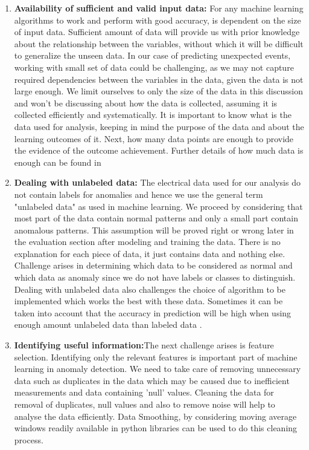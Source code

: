 \begin{enumerate}
\item \textbf{Availability of sufficient and valid input data:} For any machine learning algorithms to work and perform with good accuracy, is dependent on the size of input data. Sufficient amount of data will provide us with prior knowledge about the relationship between the variables, without which it will be difficult to generalize the unseen data. In our case of predicting unexpected events, working with small set of data could be challenging, as we may not capture required dependencies between the variables in the data, given the data is not large enough. We limit ourselves to only the size of the data in this discussion and won't be discussing about how the data is collected, assuming it is collected efficiently and systematically. It is important to know what is the data used for analysis, keeping in mind the purpose of the data and about the learning outcomes of it. Next, how many data points are enough to provide the evidence of the outcome achievement. Further details of how much data is enough can be found in \cite{rogers2002death}

\item \textbf{Dealing with unlabeled data:} The electrical data used for our analysis do not contain labels for anomalies and hence we use the general term "unlabeled data" as used in machine learning. We proceed by considering that most part of the data contain normal patterns and only a small part contain anomalous patterns. This assumption will be proved right or wrong later in the evaluation section after modeling and training the data. There is no explanation for each piece of data, it just contains data and nothing else. Challenge arises in determining which data to be considered as normal and which data as anomaly since we do not have labels or classes to distinguish. Dealing with unlabeled data also challenges the choice of algorithm to be implemented which works the best with these data. Sometimes it can be taken into account that the accuracy in prediction will be high when using enough amount unlabeled data than labeled data \cite{liang2007use}.

\item \textbf{Identifying useful information:}The next challenge arises is feature selection. Identifying only the relevant features is important part of machine learning in anomaly detection. We need to take care of removing unnecessary data such as duplicates in the data which may be caused due to inefficient measurements and data containing 'null' values. Cleaning the data for removal of duplicates, null values and also to remove noise will help to analyse the data efficiently. Data Smoothing, by considering moving average windows readily available in python libraries can be used to do this cleaning process.


\end{enumerate}
